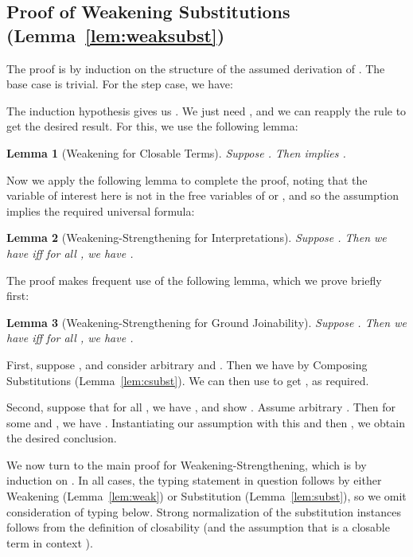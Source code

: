 \documentclass[copyright]{eptcs}
\newtheorem{lemma}{Lemma}
\begin{document}
\subsection{Proof of Weakening Substitutions (Lemma~\ref{lem:weaksubst})}
\label{sec:weaksubst}

\noindent The proof is by induction on the structure of the assumed
derivation of .  The base case is
trivial.  For the step case, we have:

\noindent The induction hypothesis gives us
.  We just need
, and we can
reapply the rule to get the desired result.  For this, we use the
following lemma:

\begin{lemma}[Weakening for Closable Terms]
\label{lem:weakclose}
Suppose .  Then
 implies
.
\end{lemma}

\noindent Now we apply the following lemma to complete the proof,
noting that the variable  of interest here is not in the free
variables of  or , and so the assumption implies the required
universal formula:

\begin{lemma}[Weakening-Strengthening for Interpretations]
\label{lem:weakstr}
Suppose .  Then we have
 iff for all
, we have .
\end{lemma}

\noindent The proof makes frequent use of the following lemma, which
we prove briefly first:

\begin{lemma}[Weakening-Strengthening for Ground Joinability]
\label{lem:weakstrj}
Suppose .  Then we have
 iff for all
, we have .
\end{lemma}

\noindent First, suppose , and consider
arbitrary  and
.  Then we have
 by Composing
Substitutions (Lemma~\ref{lem:csubst}).  We can then use  to get , as required.  

Second, suppose that for all , we have
, and show .  Assume arbitrary .  Then for
some  and , we have
.  Instantiating our assumption with this
 and then , we obtain the desired conclusion.

We now turn to the main proof for Weakening-Strengthening, which is by
induction on .  In all cases, the typing
statement in question follows by either Weakening
(Lemma~\ref{lem:weak}) or Substitution (Lemma~\ref{lem:subst}), so we
omit consideration of typing below.  Strong normalization of the
substitution instances follows from the definition of closability (and
the assumption that  is a closable term in context ).
\end{document}
